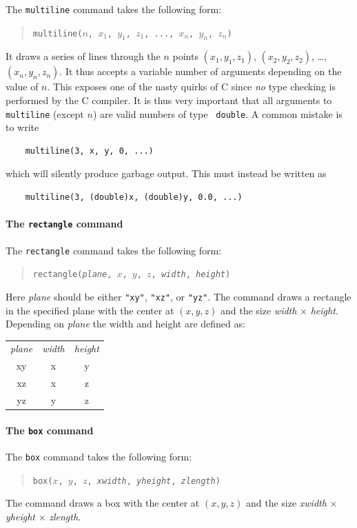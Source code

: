 The \texttt{multiline} command takes the following form:
\begin{quote}
  \texttt{multiline($n$, $x_1$, $y_1$, $z_1$, ..., $x_n$, $y_n$, $z_n$)}
\end{quote}
It draws a series of lines through the $n$ points $(x_1, y_1, z_1)$,
$(x_2, y_2, z_2)$, \ldots, $(x_n, y_n, z_n)$. It thus accepts a variable
number of arguments depending on the value of $n$. This exposes
one of the nasty quirks of C since \emph{no} type checking is
performed by the C compiler. It is thus very important that all
arguments to \texttt{multiline} (except $n$) are valid numbers of type \texttt{
  double}. A common mistake is to write
\begin{verbatim}
    multiline(3, x, y, 0, ...)
\end{verbatim}
which will silently produce garbage output. This must instead be
written as
\begin{verbatim}
    multiline(3, (double)x, (double)y, 0.0, ...)
\end{verbatim}

\paragraph{The \texttt{rectangle} command}

The \texttt{rectangle} command takes the following form:
\begin{quote}
  \texttt{rectangle(\textit{plane}, $x$, $y$, $z$, \textit{width}, \textit{height})}
\end{quote}
Here \textit{plane} should be either \verb+"xy"+, \verb+"xz"+, or
\verb+"yz"+. The command draws a rectangle in the specified plane with
the center at $(x, y, z)$ and the size \textit{width} $\times$ \textit{
height}. Depending on \textit{plane} the width and height are defined as:\\
\begin{tabular} {ccc}
  \textit{plane} & \textit{width} & \textit{height} \\
  xy & x & y \\
  xz & x & z \\
  yz & y & z \\
 \end{tabular}

\paragraph{The \texttt{box} command}

The \texttt{box} command takes the following form:
\begin{quote}
  \texttt{box($x$, $y$, $z$, \textit{xwidth}, \textit{yheight}, \textit{zlength})}
\end{quote}
The command draws a box with the center at $(x, y, z)$ and the size \textit{xwidth} $\times$ \textit{yheight} $\times$ \textit{zlength}.

